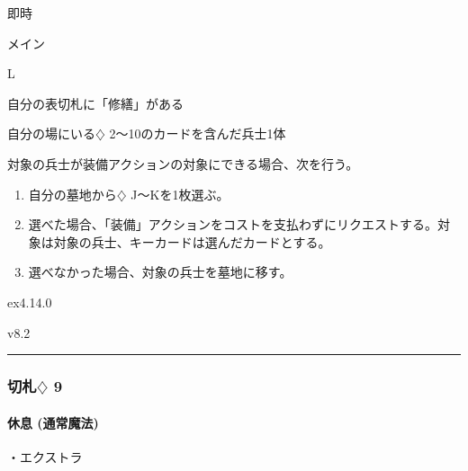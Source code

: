 \documentclass[letterpaper,10pt,dvipdfmx]{sphinxmanual}
\begin{document}
\sphinxAtStartPar
{} 即時

\sphinxAtStartPar
{} メイン

\sphinxAtStartPar
{} L

\sphinxAtStartPar
{}

\sphinxAtStartPar
自分の表切札に「修繕」がある

\sphinxAtStartPar
{}

\sphinxAtStartPar
自分の場にいる{\normalsize $\diamondsuit$} 2〜10のカードを含んだ兵士1体

\sphinxAtStartPar
{}

\sphinxAtStartPar
対象の兵士が装備アクションの対象にできる場合、次を行う。
\begin{enumerate}
%
\item {} 
\sphinxAtStartPar
自分の墓地から{\normalsize $\diamondsuit$} J〜Kを1枚選ぶ。

\item {} 
\sphinxAtStartPar
選べた場合、「装備」アクションをコストを支払わずにリクエストする。対象は対象の兵士、キーカードは選んだカードとする。

\item {} 
\sphinxAtStartPar
選べなかった場合、対象の兵士を墓地に移す。

\end{enumerate}

\sphinxAtStartPar
{}  ex4.14.0

\sphinxAtStartPar
{}  v8.2


\bigskip\hrule\bigskip



\subsubsection{切札{\normalsize $\diamondsuit$} 9}
\label{\detokenize{auto/frameActionlist:id64}}

\paragraph{休息 (通常魔法)}
\label{\detokenize{auto/frameActionlist:act-rest}}\label{\detokenize{auto/frameActionlist:id65}}
\sphinxAtStartPar
{}

\sphinxAtStartPar
・エクストラ
\end{document}
